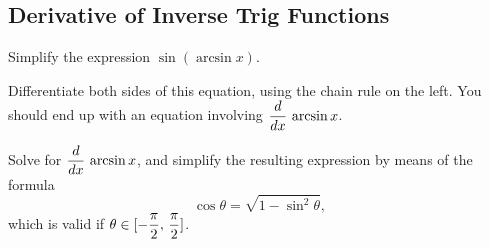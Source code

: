 
 \subsection*{Derivative of Inverse Trig Functions}
 \vsc \problem Simplify the expression $\sin (\arcsin x)$.

 \vspace{4cm} Differentiate both sides of this equation, using the
 chain rule on the left.  You should end up with an equation involving
 $\displaystyle{ \frac{d}{dx} \,\arcsin x}$.

 \vfill

 \newpage

 \problem  Solve for $\displaystyle{\frac{d}{dx} \,\arcsin x}$, and simplify the resulting
 expression by means of the formula
 $$
 \cos \theta = \sqrt{1-\sin^2 \theta}, 
 $$
 which is valid if $ \displaystyle{\theta \in [-\frac{\pi}{2},\,\frac{\pi}{2}]}$.

 \vfill

